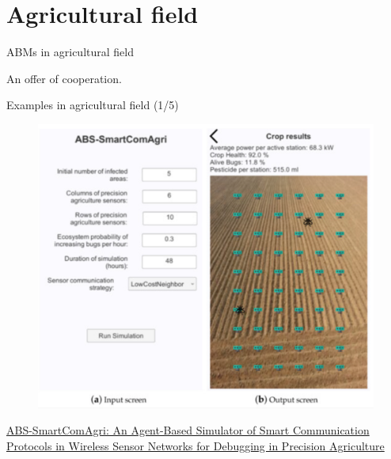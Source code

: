 \documentclass[9pt]{beamer}
\begin{document}
\section{Agricultural field}

\begin{frame}{ABMs in agricultural field}

An offer of cooperation.


\end{frame}

\begin{frame}{Examples in agricultural field (1/5)}

\begin{figure}[H]
\center
\includegraphics[scale=0.32]{agr1.png}
\label{agr1}
\end{figure}

\href{https://www.mdpi.com/1424-8220/18/4/998}{ABS-SmartComAgri: An Agent-Based Simulator of Smart Communication Protocols in Wireless Sensor Networks for Debugging in Precision Agriculture}

\end{frame}
\end{document}
